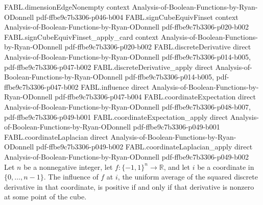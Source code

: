 \begin{theorem}
  {FABL.dimensionEdgeNonempty}
  {context}
  {Analysis-of-Boolean-Functions-by-Ryan-ODonnell}
  {pdf-ffbe9c7b3306-p046-b004}
\proofstep
  {FABL.signCubeEquivFinset}
  {context}
  {Analysis-of-Boolean-Functions-by-Ryan-ODonnell}
  {pdf-ffbe9c7b3306-p020-b002}
\proofstep
  {FABL.signCubeEquivFinset_apply_card}
  {context}
  {Analysis-of-Boolean-Functions-by-Ryan-ODonnell}
  {pdf-ffbe9c7b3306-p020-b002}
\proofstep
  {FABL.discreteDerivative}
  {direct}
  {Analysis-of-Boolean-Functions-by-Ryan-ODonnell}
  {pdf-ffbe9c7b3306-p014-b005,
    pdf-ffbe9c7b3306-p047-b002}
\proofstep
  {FABL.discreteDerivative_apply}
  {direct}
  {Analysis-of-Boolean-Functions-by-Ryan-ODonnell}
  {pdf-ffbe9c7b3306-p014-b005,
    pdf-ffbe9c7b3306-p047-b002}
\proofstep
  {FABL.influence}
  {direct}
  {Analysis-of-Boolean-Functions-by-Ryan-ODonnell}
  {pdf-ffbe9c7b3306-p047-b004}
\proofstep
  {FABL.coordinateExpectation}
  {direct}
  {Analysis-of-Boolean-Functions-by-Ryan-ODonnell}
  {pdf-ffbe9c7b3306-p048-b007,
    pdf-ffbe9c7b3306-p049-b001}
\proofstep
  {FABL.coordinateExpectation_apply}
  {direct}
  {Analysis-of-Boolean-Functions-by-Ryan-ODonnell}
  {pdf-ffbe9c7b3306-p049-b001}
\proofstep
  {FABL.coordinateLaplacian}
  {direct}
  {Analysis-of-Boolean-Functions-by-Ryan-ODonnell}
  {pdf-ffbe9c7b3306-p049-b002}
\proofstep
  {FABL.coordinateLaplacian_apply}
  {direct}
  {Analysis-of-Boolean-Functions-by-Ryan-ODonnell}
  {pdf-ffbe9c7b3306-p049-b002}
Let $n$ be a nonnegative integer, let $f:\{−1,1\}^n\to\mathbb R$, and let $i$ be a
coordinate in $\{0,\ldots,n-1\}$. The influence of $f$ at $i$, the uniform average of
the squared discrete derivative in that coordinate, is positive if and only if that
derivative is nonzero at some point of the cube.
\end{theorem}

